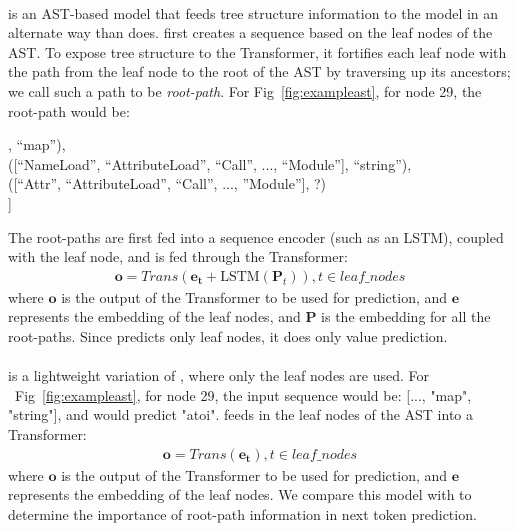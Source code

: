 \documentclass[nonacm, sigconf]{acmart}
\renewcommand{\vec}[1]{\boldsymbol{#1}}
\newcommand{\mat}[1]{\boldsymbol{#1}}
\newcommand{\figref}[1]{Fig~\ref{#1}}
\begin{document}
\paragraph{\textbf{\RootPath}}
\RootPath is an AST-based model that feeds tree structure information to the model in an alternate way than \DFS does. \RootPath first creates a sequence based on the leaf nodes of the AST. To expose tree structure to the Transformer, it fortifies each leaf node with the path from the leaf node to the root of the AST by traversing up its ancestors; we call such a path to be \textit{root-path}.  For Fig~\ref{fig:exampleast}, for node 29, the root-path would be:

\noindent
[..., \\
([``NameLoad'', ``Call'', ... ``Module''], “map”), \\
([``NameLoad'', ``AttributeLoad'', ``Call'', ..., ``Module''], “string”), \\
([``Attr'', ``AttributeLoad'', ``Call'', ..., ''Module''], ?)\\
]

The root-paths are first fed into a sequence encoder (such as an LSTM), coupled with the leaf node, and is fed through the Transformer:
\begin{align*}
    \vec{o} = Trans(\vec{e_{t}} + \text{LSTM}(\mat{P}_{t})), t\in \mathit{leaf\_nodes}
\end{align*}
where $\vec{o}$ is the output of the Transformer to be used for prediction, and $\vec{e}$ represents the embedding of the leaf nodes, and $\mat{P}$ is the embedding for all the root-paths.  
Since \RootPath predicts only leaf nodes, it does only value prediction.




\paragraph{\textbf{\LeafTokens}}
\LeafTokens is a lightweight variation of \RootPath, where only the leaf nodes are used. For ~\figref{fig:exampleast}, for node 29, the input sequence would be: [..., "map", "string"], and would predict "atoi". \LeafTokens feeds in the leaf nodes of the AST into a Transformer:  
\begin{align*}
    \vec{o} = Trans(\vec{e_{t}}), t\in \mathit{leaf\_nodes}
\end{align*}
where $\vec{o}$ is the output of the Transformer to be used for prediction, and $\vec{e}$ represents the embedding of the leaf nodes. We compare this model with \RootPath to determine the importance of root-path information in next token prediction.
\end{document}
